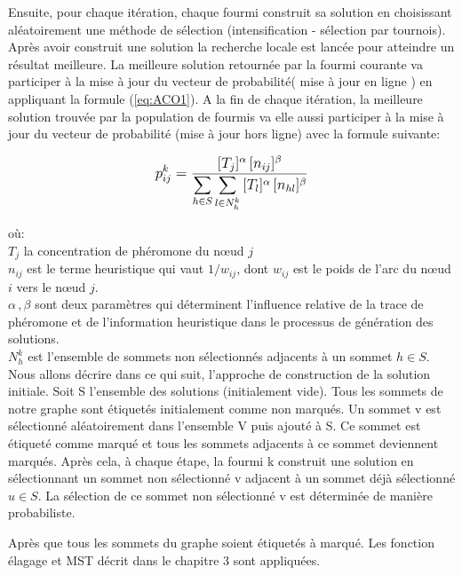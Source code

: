 \begin{enumerate}
Ensuite, pour chaque itération, chaque fourmi construit sa solution en choisissant aléatoirement une méthode de sélection (intensification - sélection par tournois). Après avoir construit une solution la recherche locale est lancée pour atteindre un résultat meilleure. La meilleure solution retournée par la fourmi courante va participer à la mise à jour du vecteur de probabilité( mise à jour en ligne ) en appliquant la formule (\ref{eq:ACO1}). A la fin de chaque itération, la meilleure solution trouvée par la population de fourmis va elle aussi participer à la mise à jour du vecteur de probabilité  (mise à jour hors ligne) avec la formule suivante:

\begin{equation}
	\label{eq:ACO1}
	\mathlarger{
		p_{ij}^k = \frac{
				[T_j]^\alpha \, [n_{ij}]^\beta
			}{
				\mathlarger{\sum}_{h \in S} \, \mathlarger{\sum}_{l \in N_h^k} \, [T_l]^\alpha \, [n_{hl}]^\beta
			}
	}
\end{equation}


où:\\
$T_j$ la concentration de phéromone du nœud $j$ \\
$n_{ij}$ est le terme heuristique qui vaut $1 / w_{ij}$, dont $w_{ij}$ est le poids de l’arc du nœud $i$ vers le nœud $j$.\\
$\alpha \, , \beta$ sont deux paramètres qui déterminent l'influence relative de la trace de phéromone et de l'information heuristique dans le processus de génération des solutions. \\
$N_h^k$ est l'ensemble de sommets non sélectionnés adjacents à un sommet $h \in S$. \\

Nous allons décrire dans ce qui suit, l'approche de construction de la solution initiale. Soit S l'ensemble des solutions (initialement vide). Tous les sommets de notre graphe sont étiquetés initialement comme non marqués. Un sommet v est sélectionné aléatoirement dans l'ensemble V puis  ajouté à S. Ce sommet est étiqueté comme marqué et tous les sommets adjacents à ce sommet deviennent marqués. Après cela, à chaque étape, la fourmi k construit une solution en sélectionnant un sommet non sélectionné v adjacent à un sommet déjà sélectionné $u \in S$. La sélection de ce sommet non sélectionné v est déterminée de manière probabiliste.


Après que tous les sommets du graphe soient étiquetés à marqué. Les fonction élagage et MST décrit dans le chapitre 3 sont appliquées.\\


\end{enumerate}
